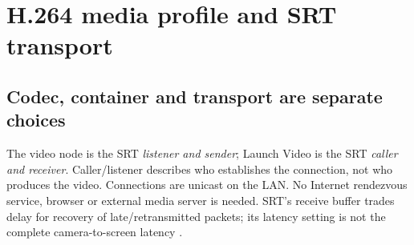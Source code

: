 \section{H.264 media profile and SRT transport}\label{sec:video}
\subsection{Codec, container and transport are separate choices}

The video node is the SRT \emph{listener and sender}; Launch Video is the SRT
\emph{caller and receiver}. Caller/listener describes who establishes the
connection, not who produces the video. Connections are unicast on the LAN.
No Internet rendezvous service, browser or external media server is needed.
SRT's receive buffer trades delay for recovery of late/retransmitted packets;
its latency setting is not the complete camera-to-screen latency \cite{srtlatency}.

